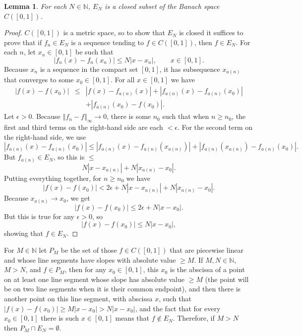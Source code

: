 \documentclass{article}
\newcommand{\norm}[1]{\left\Vert #1 \right\Vert}
\newtheorem{lemma}[theorem]{Lemma}
\theoremstyle{definition}
\begin{document}
\begin{lemma}
For each $N \in \mathbb{N}$, $E_N$ is a closed subset of the Banach space $C([0,1])$. 
\end{lemma}
\begin{proof}
$C([0,1])$ is a metric space, so to show that  $E_N$ is closed it suffices to prove that if $f_n \in E_N$ is a sequence tending to $f \in C([0,1])$, then $f \in E_N$. 
For each $n$, let $x_n \in [0,1]$ be such that
\[
|f_n(x)-f_n(x_n)| \leq N|x-x_n|, \qquad x \in [0,1].
\]
Because $x_n$ is a sequence in the compact set $[0,1]$, it has subsequence $x_{a(n)}$ that converges to some $x_0 \in [0,1]$. 
For all $x \in [0,1]$ we have
\begin{eqnarray*}
|f(x)-f(x_0)|&\leq&|f(x)-f_{a(n)}(x)|+|f_{a(n)}(x)-f_{a(n)}(x_0)|\\
&&+|f_{a(n)}(x_0)-f(x_0)|.
\end{eqnarray*}
Let $\epsilon>0$. Because $\norm{f_n-f}_\infty \to 0$, there is some $n_0$ such that when $n \geq n_0$, the first and third terms on the right-hand side
are each $<\epsilon$. For the second term on the right-hand side, we use
\[
|f_{a(n)}(x)-f_{a(n)}(x_0)| \leq |f_{a(n)}(x)-f_{a(n)}(x_{a(n)})| + |f_{a(n)}(x_{a(n)})-f_{a(n)}(x_0)|.
\]
But $f_{a(n)} \in E_N$, so this is $\leq$
\[
N|x-x_{a(n)}| + N|x_{a(n)}-x_0|.
\]
Putting everything together, for $n \geq n_0$ we have
\[
|f(x)-f(x_0)| < 2\epsilon + N|x-x_{a(n)}| + N|x_{a(n)}-x_0|.
\]
Because $x_{a(n)} \to x_0$, we get
\[
|f(x)-f(x_0)| \leq 2\epsilon + N|x-x_0|.
\]
But this is true for any $\epsilon>0$, so
\[
|f(x)-f(x_0)| \leq N|x-x_0|,
\]
showing that $f \in E_N$.
\end{proof}

For $M \in \mathbb{N}$  let $P_M$ be the set of those $f \in C([0,1])$ that are piecewise linear and whose line segments have slopes
with absolute value $\geq M$. If $M, N \in \mathbb{N}$, $M>N$, and $f \in P_M$, then for any $x_0 \in [0,1]$, this $x_0$ is the abscissa of a point
on at least one line segment whose
slope has absolute value $\geq M$ (the point will be on two line segments when it is their common endpoint), and then there is another point on this line segment,
with abscissa $x$, such that $|f(x)-f(x_0)| \geq M|x-x_0|>N|x-x_0|$, and the fact that for every $x_0 \in [0,1]$ there is such $x \in [0,1]$ means that
$f \not \in E_N$. Therefore, if $M>N$ then $P_M \cap E_N = \emptyset$. 
\end{document}
